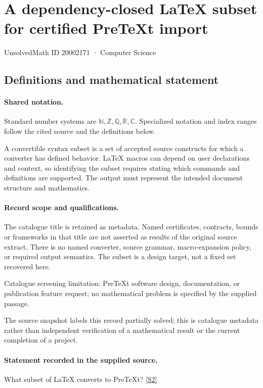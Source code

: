 \documentclass[11pt]{article}
\newcommand{\sref}[2]{\hyperlink{source:#1:#2}{[S#2]}}
\begin{document}
\setcounter{section}{20002170}
\section{A dependency-closed LaTeX subset for certified PreTeXt import}\label{20002171}
{\small\sffamily UnsolvedMath ID 20002171 · Computer Science}
\subsection{Definitions and mathematical statement}

\paragraph{Shared notation.}Standard number systems are $\mathbb N,\mathbb Z,\mathbb Q,\mathbb R,\mathbb C$. Specialized notation and index ranges follow the cited source and the definitions below.


A convertible syntax subset is a set of accepted source constructs for which a converter has defined behavior. LaTeX macros can depend on user declarations and context, so identifying the subset requires stating which commands and definitions are supported. The output must represent the intended document structure and mathematics.
\paragraph{Record scope and qualifications.}
The catalogue title is retained as metadata. Named certificates, contracts, bounds or frameworks in that title are not asserted as results of the original source extract.
There is no named converter, source grammar, macro-expansion policy, or required output semantics. The subset is a design target, not a fixed set recovered here.

Catalogue screening limitation: PreTeXt software design, documentation, or publication feature request; no mathematical problem is specified by the supplied passage.

The source snapshot labels this record partially solved; this is catalogue metadata rather than independent verification of a mathematical result or the current completion of a project.
\paragraph{Statement recorded in the supplied source.}
What subset of LaTeX converts to PreTeXt? \sref{20002171}{2}
\end{document}
